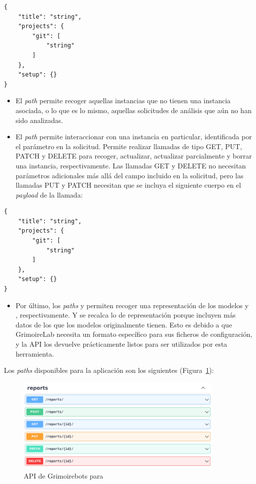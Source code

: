 \begin{lstlisting}
{
    "title": "string",
    "projects": {
        "git": [
            "string"
        ]
    },
    "setup": {}
}
\end{lstlisting}

\begin{itemize}
    \item El \emph{path}  permite recoger aquellas instancias  que no tienen una instancia  asociada, o lo que es lo mismo, aquellas solicitudes de análisis que aún no han sido analizadas.
    \item El \emph{path}  permite interaccionar con una instancia  en particular, identificada por el parámetro  en la solicitud. Permite realizar llamadas de tipo GET, PUT, PATCH y DELETE para recoger, actualizar, actualizar parcialmente y borrar una instancia, respectivamente. Las llamadas GET y DELETE no necesitan parámetros adicionales más allá del campo  incluido en la solicitud, pero las llamadas PUT y PATCH necesitan que se incluya el siguiente cuerpo en el \emph{payload} de la llamada:
\end{itemize}

\begin{lstlisting}
{
    "title": "string",
    "projects": {
        "git": [
            "string"
        ]
    },
    "setup": {}
}
\end{lstlisting}

\begin{itemize}
    \item Por último, los \emph{paths}  y  permiten recoger una representación de los modelos  y , respectivamente. Y se recalca lo de representación porque incluyen más datos de los que los modelos originalmente tienen. Esto es debido a que GrimoireLab necesita un formato específico para sus ficheros de configuración, y la API los devuelve prácticamente listos para ser utilizados por esta herramienta.
\end{itemize}

Los \emph{paths} disponibles para la aplicación  son los siguientes (Figura~{\ref{fig:grimoirebots_api_reports}}):

\begin{figure}[ht]
    \centering
    \includegraphics[width=0.9\textwidth]{Figures/grimoirebots_api_reports}
    \decoRule
    \caption[Grimoirebots API ()]{API de Grimoirebots para }
    \label{fig:grimoirebots_api_reports}
\end{figure}


